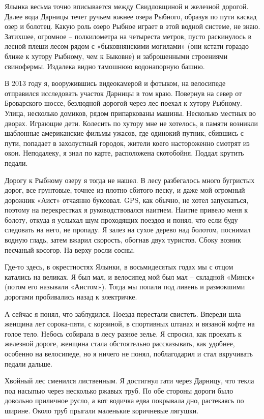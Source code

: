 Ялынка весьма точно вписывается между Свидловщиной и железной дорогой. Далее вода Дарницы течет ручьем южнее озера Рыбного, образуя по пути каскад озер и болотец. Какую роль озеро Рыбное играет в этой водной системе, не знаю. Затихшее, огромное – полкилометра на четыреста метров, пусто раскинулось в лесной плеши лесом рядом с «быковнянскими могилами» (они кстати гораздо ближе к хутору Рыбному, чем к Быковне) и заброшенными строениями свинофермы. Издалека видно тамошнюю водонапорную башню.

В 2013 году я, вооружившись видеокамерой и фотыком, на велосипеде отправился исследовать участок Дарницы в том краю. Повернув на север от Броварского шоссе, безлюдной дорогой через лес поехал к хутору Рыбному. Улица, несколько домиков, рядом припаркованы машины. Несколько местных во дворах. Играющие дети. Колесить по хутору мне не хотелось, в памяти возникли шаблонные американские фильмы ужасов, где одинокий путник, сбившись с пути, попадает в захолустный городок, жители коего настороженно смотрят из окон. Неподалеку, я знал по карте, расположена скотобойня. Поддал крутить педали.

Дорогу к Рыбному озеру я тогда не нашел. В лесу разбегалось много бугристых дорог, все грунтовые, точнее из плотно сбитого песку, и даже мой огромный дорожник «Аист» отчаянно буксовал. GPS, как обычно, не хотел запускаться, поэтому на перекрестках я руководствовался наитием. Наитие привело меня к болоту, откуда я услыхал шум проходящих поездов и понял, что если буду следовать на него, не пропаду. Я залез на сухое дерево над болотом, поснимал водную гладь, затем вжарил скорость, обогнав двух туристов. Сбоку возник песчаный косогор. На верху росли сосны.

Где-то здесь, в окрестностях Ялынки, в восьмидесятых годах мы с отцом катались на великах. Я был мал, и велосипед мой был мал – складной «Минск» (потом его называли «Аистом»). Тогда мы попали под ливень и размокшими дорогами пробивались назад к электричке.

А сейчас я понял, что заблудился. Поезда перестали свистеть. Впереди шла женщина лет сорока-пяти, с корзиной, в спортивных штанах и вязаной кофте на голое тело. Небось собирала в лесу разное зелье. Я спросил, как проехать к железной дороге, женщина стала обстоятельно рассказывать, как удобнее, особенно на велосипеде, но я ничего не понял, поблагодарил и стал вкручивать педали дальше.

Хвойный лес сменился лиственным. Я достигнул гати через Дарницу, что текла под насыпью через несколько ржавых труб. По обе стороны дороги было довольно приличное русло, а вот водичка едва покрывала дно, растекаясь по ширине. Около труб прыгали маленькие коричневые лягушки.

